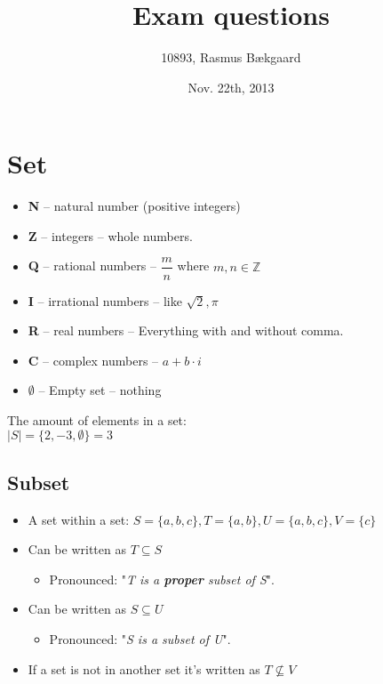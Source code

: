 \documentclass[english,10pt,a4paper]{article}
\title{Exam questions}
\author{10893, Rasmus Bækgaard}
\date{Nov. 22th, 2013}
\begin{document}
\maketitle

\tableofcontents
\newpage

\section{Set}

\begin{theo}[Symbols] 

\begin{itemize}
\item \textbf{N} -- natural number (positive integers)
\item \textbf{Z} -- integers -- whole numbers.
\item \textbf{Q} -- rational numbers -- $\dfrac{m}{n}$ where $m, n \in \mathbb{Z}$
\item \textbf{I} -- irrational numbers -- like $\sqrt{2}, \pi$
\item \textbf{R} -- real numbers -- Everything with and without comma.
\item \textbf{C} -- complex numbers -- $a+b\cdot i$
\item $\emptyset$ -- Empty set -- nothing
\end{itemize}

\end{theo}

\begin{theo} 
The amount of elements in a set:\\
$|S| = \{ 2, -3, \emptyset\} = 3$

\end{theo}




\subsection{Subset}
\begin{theo}[Basic]
\begin{itemize}
\item A set within a set: $S=\{a, b, c\}, T = \{a, b \}, U= \{ a, b, c\}, V=\{c\}$
\item Can be written as $T \subseteq S$
	\begin{itemize}
	\item Pronounced: "\textit{T is a \textbf{proper} subset of S}".
	\end{itemize}
\item Can be written as $S \subseteq U$
	\begin{itemize}
	\item Pronounced: "\textit{S is a subset of U}".
	\end{itemize}
	
\item If a set is not in another set it's written as $T \not \subseteq V$
\end{itemize}
\end{theo}
\end{document}
